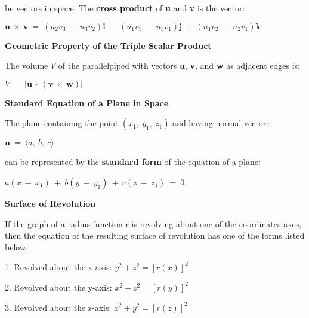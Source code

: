 \documentclass{article}
\begin{document}
\begin{large}
\hspace{0.1in} be vectors in space. The \textbf{cross product} of \textbf{u} and \textbf{v} is the vector:

\hspace{0.2in} $\textbf{u}\ \times\ \textbf{v}\ =\ (u_{2}v_{3}\ -\ u_{3}v_{2})\textbf{i}\ -\ (u_{1}v_{3}\ -\ u_{3}v_{1})\textbf{j}\ +\ (u_{1}v_{2}\ -\ u_{2}v_{1})\textbf{k}$

\textbf{Geometric Property of the Triple Scalar Product}

\hspace{0.1in} The volume $V$ of the parallelpiped with vectors \textbf{u}, \textbf{v}, and \textbf{w} as adjacent edges is:

\hspace{2.5in} $V\ =\ |\textbf{u}\ \cdot\ (\textbf{v}\ \times\ \textbf{w})|$

\vspace{1.2in}
\textbf{Standard Equation of a Plane in Space}

\hspace{0.1in} The plane containing the point $(x_{1},\ y_{1},\ z_{1})$ and having normal vector:

\hspace{2.5in} $\textbf{n}\ =\ \langle a,\ b,\ c\rangle$

\hspace{0.1in} can be represented by the \textbf{standard form} of the equation of a plane:

\hspace{1.0in} $a(x\ -\ x_{1})\ +\ b(y\ -\ y_{1})\ +\ c(z\ -\ z_{1})\ =\ 0$.

\textbf{Surface of Revolution}

\hspace{0.2in}If the graph of a radius function r is revolving about one of the coordinates axes, then the equation of the resulting surface of revolution has one of the forms listed below.

1. Revolved about the x-axis: $y^2+z^2=[r(x)]^2$

2. Revolved about the y-axis: $x^2+z^2=[r(y)]^2$

3. Revolved about the z-axis: $x^2+y^2=[r(z)]^2$

\newpage






\newpage


\end{large}
\end{document}
